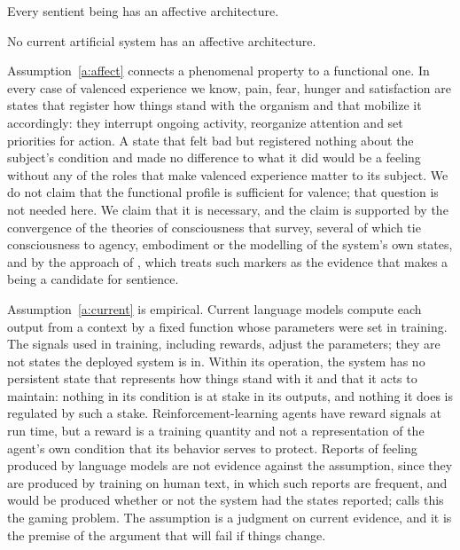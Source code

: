 \documentclass{situationist-preprint}
\begin{document}
\begin{assumption}\label{a:affect}
Every sentient being has an affective architecture.
\end{assumption}

\begin{assumption}\label{a:current}
No current artificial system has an affective architecture.
\end{assumption}

Assumption~\ref{a:affect} connects a phenomenal property to a functional one. In every case of valenced experience we know, pain, fear, hunger and satisfaction are states that register how things stand with the organism and that mobilize it accordingly: they interrupt ongoing activity, reorganize attention and set priorities for action. A state that felt bad but registered nothing about the subject's condition and made no difference to what it did would be a feeling without any of the roles that make valenced experience matter to its subject. We do not claim that the functional profile is sufficient for valence; that question is not needed here. We claim that it is necessary, and the claim is supported by the convergence of the theories of consciousness that \citet{Butlin2023} survey, several of which tie consciousness to agency, embodiment or the modelling of the system's own states, and by the approach of \citet{Birch2024}, which treats such markers as the evidence that makes a being a candidate for sentience.

Assumption~\ref{a:current} is empirical. Current language models compute each output from a context by a fixed function whose parameters were set in training. The signals used in training, including rewards, adjust the parameters; they are not states the deployed system is in. Within its operation, the system has no persistent state that represents how things stand with it and that it acts to maintain: nothing in its condition is at stake in its outputs, and nothing it does is regulated by such a stake. Reinforcement-learning agents have reward signals at run time, but a reward is a training quantity and not a representation of the agent's own condition that its behavior serves to protect. Reports of feeling produced by language models are not evidence against the assumption, since they are produced by training on human text, in which such reports are frequent, and would be produced whether or not the system had the states reported; \citet{Birch2024} calls this the gaming problem. The assumption is a judgment on current evidence, and it is the premise of the argument that will fail if things change.
\end{document}
